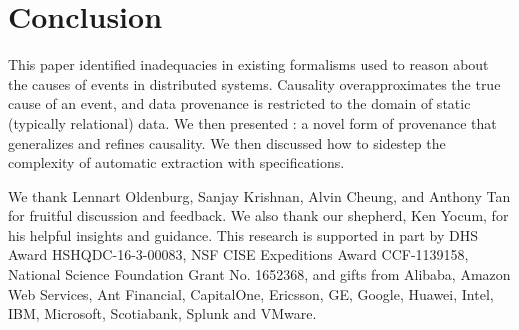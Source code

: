 \section{Conclusion}
This paper identified inadequacies in existing formalisms used to reason about
the causes of events in distributed systems. Causality overapproximates the
true cause of an event, and data provenance is restricted to the domain of
static (typically relational) data. We then presented \watprovenance{}: a novel
form of provenance that generalizes \whyprovenance{} and refines causality. We
then discussed how to sidestep the complexity of automatic \watprovenance{}
extraction with \watprovenance{} specifications.

\begin{acks}
  We thank Lennart Oldenburg, Sanjay Krishnan, Alvin Cheung, and Anthony Tan
  for fruitful discussion and feedback. We also thank our shepherd, Ken Yocum,
  for his helpful insights and guidance.
  This research is supported in part by DHS Award HSHQDC-16-3-00083, NSF CISE
  Expeditions Award CCF-1139158, National Science Foundation Grant No. 1652368,
  and gifts from Alibaba, Amazon Web Services, Ant Financial, CapitalOne,
  Ericsson, GE, Google, Huawei, Intel, IBM, Microsoft, Scotiabank, Splunk and
  VMware.
\end{acks}
